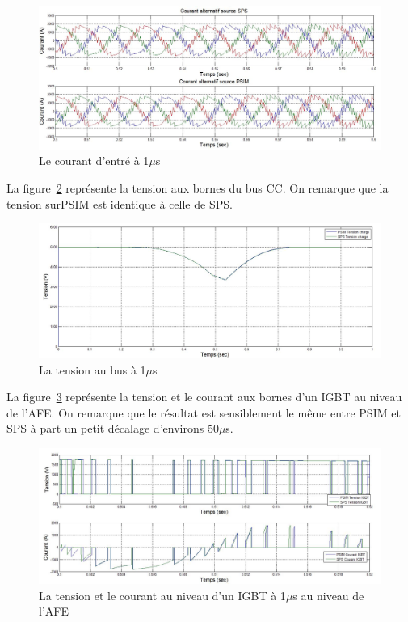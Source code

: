 \documentclass[11pt,letterpaper,final]{report}
\begin{document}
\begin{figure}[htb]
\centering
\includegraphics[scale=0.5]{Fig/DCP_AFE/1u/cour_al.jpg}
\caption{Le courant d'entré à 1$\mu$s}
\label{AF_DC_cou1}
\end{figure}

La figure~\ref{AF_DC_vch1} représente la tension aux bornes du bus CC. On remarque que la tension surPSIM est identique à celle de SPS.

\begin{figure}[htb]
\centering
\includegraphics[scale=0.5]{Fig/DCP_AFE/1u/ten_bus.jpg}
\caption{La tension au bus à 1$\mu$s}
\label{AF_DC_vch1}
\end{figure}

La figure~\ref{AF_DC_IGBT1} représente la tension et le courant aux bornes d'un IGBT au niveau de l'AFE. On remarque que le résultat est sensiblement le même entre PSIM et SPS à part un petit décalage d'environs 50$\mu$s.

\begin{figure}[htb]
\centering
\includegraphics[scale=0.5]{Fig/DCP_AFE/1u/IGBT_afe.jpg}
\caption{La tension et le courant au niveau d'un IGBT à 1$\mu$s au niveau de l'AFE}
\label{AF_DC_IGBT1}
\end{figure}
\end{document}
